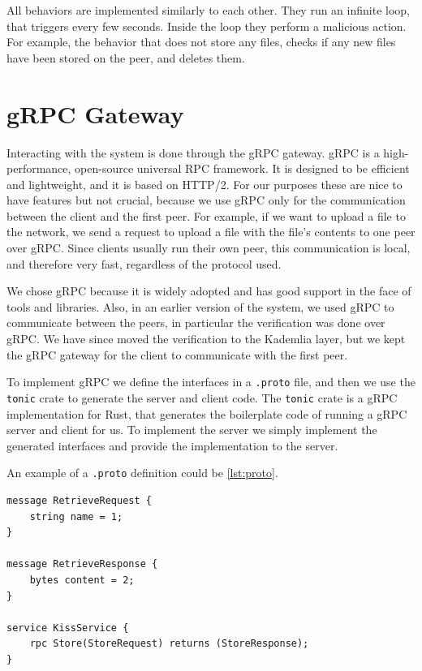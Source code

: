 All behaviors are implemented similarly to each other.
They run an infinite loop, that triggers every few seconds.
Inside the loop they perform a malicious action.
For example, the behavior that does not store any files,
checks if any new files have been stored on the peer, and deletes them.

\section{gRPC Gateway}

Interacting with the system is done through the gRPC gateway.
gRPC is a high-performance, open-source universal RPC framework.
It is designed to be efficient and lightweight, and it is based on HTTP/2.
For our purposes these are nice to have features but not crucial,
because we use gRPC only for the communication between the client and the first peer.
For example, if we want to upload a file to the network,
we send a request to upload a file with the file's contents to one peer over gRPC.
Since clients usually run their own peer, this communication is local,
and therefore very fast, regardless of the protocol used.

We chose gRPC because it is widely adopted and has good support in the face of
tools and libraries.
Also, in an earlier version of the system, we used gRPC to communicate between the peers,
in particular the verification was done over gRPC.
We have since moved the verification to the Kademlia layer,
but we kept the gRPC gateway for the client to communicate with the first peer.

To implement gRPC we define the interfaces in a \texttt{.proto} file,
and then we use the \texttt{tonic} crate to generate the server and client code.
The \texttt{tonic} crate is a gRPC implementation for Rust,
that generates the boilerplate code of running a gRPC server and client for us.
To implement the server we simply implement the generated interfaces
and provide the implementation to the server.

An example of a \texttt{.proto} definition could be \autoref{lst:proto}.

\begin{lstlisting}[caption={Example of a .proto file}, label={lst:proto}]
message RetrieveRequest {
    string name = 1;
}

message RetrieveResponse {
    bytes content = 2;
}

service KissService {
    rpc Store(StoreRequest) returns (StoreResponse);
}
\end{lstlisting}

